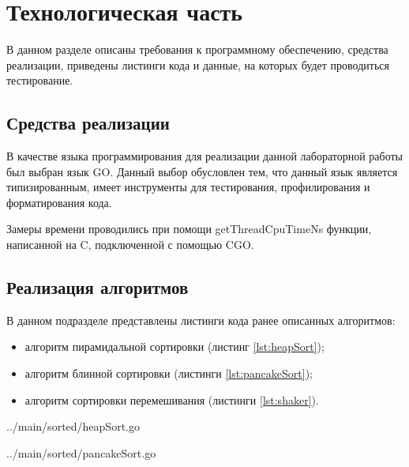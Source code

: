 \chapter{Технологическая часть}

В данном разделе описаны требования к программному обеспечению, средства
реализации, приведены листинги кода и данные, на которых будет проводиться
тестирование.


\section{Средства реализации}

В качестве языка программирования для реализации данной лабораторной работы был выбран язык GO\cite{go}. Данный
выбор обусловлен тем, что данный язык является типизированным, имеет инструменты 
для тестирования, профилирования и форматирования кода.

Замеры времени проводились при помощи getThreadCpuTimeNs функции, написанной на C, 
подключенной с помощью CGO.\cite{cgo}

\section{Реализация алгоритмов}

В данном подразделе представлены листинги кода ранее описанных алгоритмов:
\begin{itemize}[left=\parindent]
    \item алгоритм пирамидальной сортировки (листинг \ref{lst:heapSort});
    \item алгоритм блинной сортировки (листинги \ref{lst:pancakeSort});
    \item алгоритм сортировки перемешивания (листинги \ref{lst:shaker}).
\end{itemize}

\noindent
\begin{minipage}{\linewidth}
\begin{lstinputlisting}[
	caption={Реализация алгоритма пирамидальной сортировки.},
	label={lst:heapSort},
	linerange={3-35}
]{../main/sorted/heapSort.go}
\end{lstinputlisting}
\end{minipage}

\noindent
\begin{minipage}{\linewidth}
\begin{lstinputlisting}[
	caption={Реализация алгоритма блинной сортировки.},
	label={lst:pancakeSort},
	linerange={3-41}
]{../main/sorted/pancakeSort.go}
\end{lstinputlisting}
\end{minipage}

